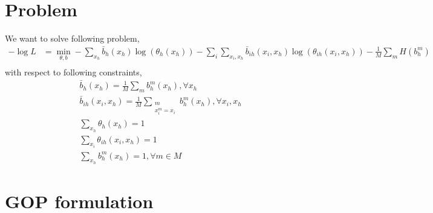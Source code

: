 \documentclass{article}
\begin{document}
\section{Problem}
We want to solve following problem,
\begin{align*}
-\log L&=\min_{\theta,b}-\sum_{x_h}\bar{b}_h(x_h)\log(\theta_h(x_h))-\sum_i \sum_{x_i,x_h} \bar{b}_{ih}(x_i,x_h)\log(\theta_{ih}(x_i,x_h))-\frac{1}{M}\sum_mH(b_h^m)\\
\end{align*}
with respect to following constraints,
\begin{align*}
&\bar{b}_h(x_h)=\frac{1}{M}\sum_m b_h^m(x_h), \forall x_h\\
&\bar{b}_{ih}(x_i,x_h)=\frac{1}{M}\sum_{\substack{m\\ x_i^m=x_i}}b_h^m(x_h),  \forall x_i, x_h \\
&\sum_{x_h}\theta_h(x_h)=1\\
&\sum_{x_i}\theta_{ih}(x_i,x_h)=1\\
&\sum_{x_h}b_h^m(x_h)=1, \forall m\in M
\end{align*}
\section{GOP formulation}
\end{document}
